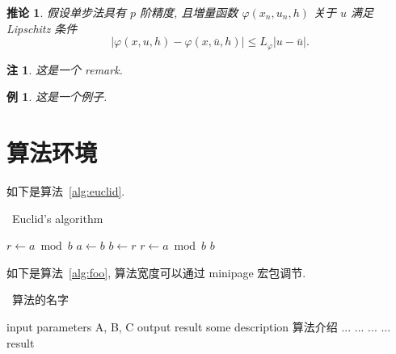 \documentclass[UTF8,openany,twoside,12pt]{ctexbook}
\theoremstyle{plain}
\newtheorem{example}{例}[chapter]
\newtheorem{corollary}{推论}[chapter]
\newtheorem{remark}{注}[chapter]
\begin{document}
\begin{corollary}\label{col:convergence}
假设单步法具有 $p$ 阶精度, 且増量函数 $\varphi(x_{n}, u_{n}, h)$ 关于 $u$ 满足 \textup{Lipschitz} 条件
\begin{equation}\label{eq:conver3}
|\varphi(x, u, h)-\varphi(x, \bar{u}, h)| \leqslant L_{\varphi}|u-\bar{u}|.
\end{equation}
\end{corollary}

\begin{remark}\label{rem:remark}
这是一个 remark.
\end{remark}

\begin{example}
这是一个例子.
\end{example}


\section{算法环境}

如下是算法~\ref{alg:euclid}.
\begin{algorithm}[H]
\small
\caption{~Euclid's algorithm}\label{alg:euclid}
\begin{algorithmic}[1]
  \State $r\gets a\bmod b$
  \State $a\gets b$
  \State $b\gets r$
  \State $r\gets a\bmod b$
  \EndWhile\label{euclidendwhile}
  \State \Return $b$
  \EndProcedure
\end{algorithmic}
\end{algorithm}

如下是算法~\ref{alg:foo}, 算法宽度可以通过 minipage 宏包调节.

\begin{center}
\vspace{-2ex}
\begin{minipage}{.9\linewidth}
\begin{algorithm}[H]
\caption{~算法的名字}\label{alg:foo}
\begin{algorithmic}[1]
\Require input parameters A, B, C
\Ensure output result
\State some description 算法介绍
  \State ...
    \State ...
    \Else
    \State ...
  \EndIf
\EndFor
{}
  \State ...
\EndWhile
\State \Return result
\end{algorithmic}
\end{algorithm}
\end{minipage}
\end{center}
\end{document}
